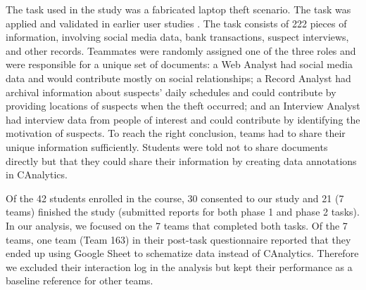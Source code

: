 The task used in the study was a fabricated laptop theft scenario. The task was applied and validated in earlier user studies \citep{Carroll2013, Borge2012}. The task consists of 222 pieces of information, involving social media data, bank transactions, suspect interviews, and other records. Teammates were randomly assigned one of the three roles and were responsible for a unique set of documents: a Web Analyst had social media data and would contribute mostly on social relationships; a Record Analyst had archival information about suspects' daily schedules and could contribute by providing locations of suspects when the theft occurred; and an Interview Analyst had interview data from people of interest and could contribute by identifying the motivation of suspects. To reach the right conclusion, teams had to share their unique information sufficiently. Students were told not to share documents directly but that they could share their information by creating data annotations in CAnalytics.

Of the 42 students enrolled in the course, 30 consented to our study and 21 (7 teams) finished the study (submitted reports for both phase 1 and phase 2 tasks). In our analysis, we focused on the 7 teams that completed both tasks. Of the 7 teams, one team (Team 163) in their post-task questionnaire reported that they ended up using Google Sheet to schematize data instead of CAnalytics. Therefore we excluded their interaction log in the analysis but kept their performance as a baseline reference for other teams.


